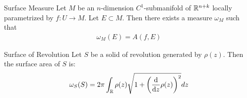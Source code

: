 \begin{importanttheorem}{Surface Measure}{}
	Let $M$ be an $n$-dimension $C^1$-submanifold of $\mathbb{R}^{n+k}$ locally parametrized by $f : U \to M$. Let $E \subset M$. Then there exists a measure $\omega_M$ such that
	\begin{align*}
		\omega_M(E) = A(f,E)
	\end{align*}
\end{importanttheorem}

\begin{importanttheorem}{Surface of Revolution}{}
	Let $S$ be a solid of revolution generated by $\rho(z)$. Then the surface area of $S$ is:
	\begin{align*}
		\omega_S(S) = 2\pi \int_{\mathbb{R}} \rho(z) \sqrt{1 + \qty(\dv{z} \rho(z))^2} dz
	\end{align*}
\end{importanttheorem}
